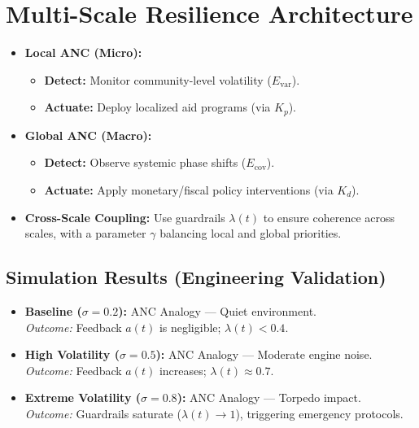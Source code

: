 \documentclass{article}
\theoremstyle{definition}
\begin{document}
\section{Multi-Scale Resilience Architecture}
\begin{itemize}
    \item \textbf{Local ANC (Micro):} 
    \begin{itemize}
        \item \textbf{Detect:} Monitor community-level volatility ($E_{\text{var}}$).
        \item \textbf{Actuate:} Deploy localized aid programs (via $K_p$).
    \end{itemize}
    \item \textbf{Global ANC (Macro):} 
    \begin{itemize}
        \item \textbf{Detect:} Observe systemic phase shifts ($E_{\text{cov}}$).
        \item \textbf{Actuate:} Apply monetary/fiscal policy interventions (via $K_d$).
    \end{itemize}
    \item \textbf{Cross-Scale Coupling:} Use guardrails $\lambda(t)$ to ensure coherence across scales, with a parameter $\gamma$ balancing local and global priorities.
\end{itemize}

\subsection{Simulation Results (Engineering Validation)}
\begin{itemize}
    \item \textbf{Baseline ($\sigma = 0.2$):} ANC Analogy --- Quiet environment. \\
    \quad \textit{Outcome:} Feedback $a(t)$ is negligible; $\lambda(t) < 0.4$.
    \item \textbf{High Volatility ($\sigma = 0.5$):} ANC Analogy --- Moderate engine noise. \\
    \quad \textit{Outcome:} Feedback $a(t)$ increases; $\lambda(t) \approx 0.7$.
    \item \textbf{Extreme Volatility ($\sigma = 0.8$):} ANC Analogy --- Torpedo impact. \\
    \quad \textit{Outcome:} Guardrails saturate ($\lambda(t) \rightarrow 1$), triggering emergency protocols.
\end{itemize}
\end{document}

